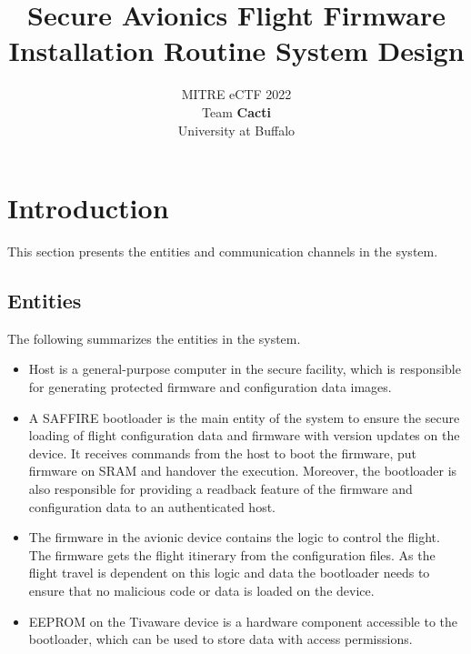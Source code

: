 \documentclass[11pt,oneside,onecolumn,letterpaper]{article}
\title{Secure Avionics Flight Firmware Installation Routine System Design}
\author{MITRE eCTF 2022\\Team \textbf{Cacti}\\ University at Buffalo}
\date{}
\begin{document}
\normalsize


\maketitle

\renewcommand{\thepage}{System Design, Team Cacti, University at Buffalo--\arabic{page}}
\setcounter{page}{1} \normalsize
%

\newcommand{\flagRollback}{\textsf{Rollback}\xspace}

\section{Introduction}

This section presents the entities and communication channels in the system.

\subsection{Entities}

The following summarizes the entities in the system.

\begin{itemize}
  \item Host is a general-purpose computer in the secure facility, which is responsible for generating protected firmware and configuration data images.
	\item A SAFFIRE bootloader is the main entity of the system to ensure the secure loading of flight configuration data and firmware with version updates on the device.
	It receives commands from the host to boot the firmware, put firmware on SRAM and handover the execution. 
	Moreover, the bootloader is also responsible for providing a readback feature of the firmware and configuration data to an authenticated host.
	\item The firmware in the avionic device contains the logic to control the flight. 
	The firmware gets the flight itinerary from the configuration files.
	As the flight travel is dependent on this logic and data the bootloader needs to ensure that no malicious code or data is loaded on the device.
  \item  EEPROM on the Tivaware device is a hardware component accessible to the bootloader, which can be used to store data with access permissions.
\end{itemize}
\end{document}
